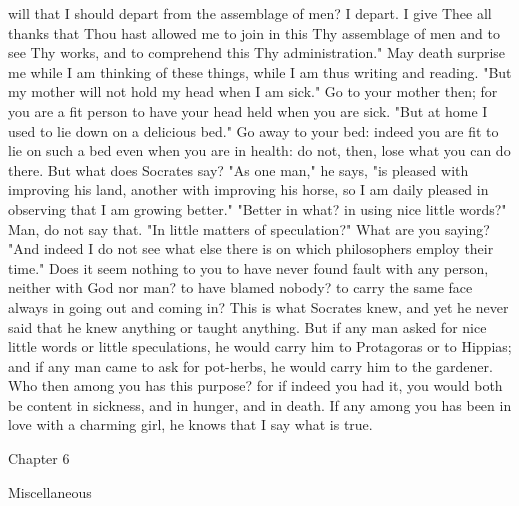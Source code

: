 \documentclass[a4paper]{article}
\begin{document}
will that I should depart from the assemblage of men? I depart. I give Thee all
thanks that Thou hast allowed me to join in this Thy assemblage of men and to
see Thy works, and to comprehend this Thy administration." May death surprise
me while I am thinking of these things, while I am thus writing and reading.
    "But my mother will not hold my head when I am sick." Go to your mother
then; for you are a fit person to have your head held when you are sick. "But
at home I used to lie down on a delicious bed." Go away to your bed: indeed you
are fit to lie on such a bed even when you are in health: do not, then, lose
what you can do there.
    But what does Socrates say? "As one man," he says, "is pleased with
improving his land, another with improving his horse, so I am daily pleased in
observing that I am growing better." "Better in what? in using nice little
words?" Man, do not say that. "In little matters of speculation?" What are you
saying? "And indeed I do not see what else there is on which philosophers
employ their time." Does it seem nothing to you to have never found fault with
any person, neither with God nor man? to have blamed nobody? to carry the same
face always in going out and coming in? This is what Socrates knew, and yet he
never said that he knew anything or taught anything. But if any man asked for
nice little words or little speculations, he would carry him to Protagoras or
to Hippias; and if any man came to ask for pot-herbs, he would carry him to the
gardener. Who then among you has this purpose? for if indeed you had it, you
would both be content in sickness, and in hunger, and in death. If any among
you has been in love with a charming girl, he knows that I say what is true.

Chapter 6

Miscellaneous
\end{document}
